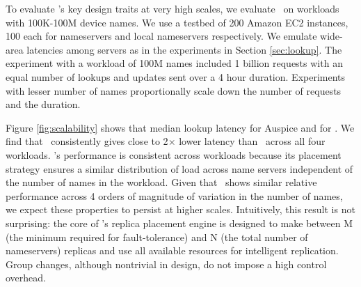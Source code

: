 To evaluate \auspice's key design traits at very high scales, we evaluate \auspice\ on workloads with 100K-100M device names.  We use a testbed of 200 Amazon EC2 instances, 100 each for nameservers and local nameservers respectively. We emulate wide-area latencies among servers as in the experiments in Section \ref{sec:lookup}. The experiment with a workload of 100M names included 1 billion requests with an equal number of lookups and updates sent over a 4 hour duration. Experiments with lesser number of names proportionally scale down the number of requests and the  duration.  

Figure \ref{fig:scalability} shows that median lookup latency for Auspice and for \staticthree. We find that \auspice\ consistently gives close to 2$\times$ lower latency than \staticthree\ across all four workloads. 
\auspice's performance is consistent across workloads because its placement strategy ensures a similar distribution of load across name servers independent of the number of names in the workload.
Given that \auspice\ shows similar relative performance across 4 orders of magnitude of variation in the number of names, we expect these properties to persist at higher scales. Intuitively, this result is not surprising: the core of \auspice's replica placement engine is designed to make between M (the minimum required for fault-tolerance) and N (the total number of nameservers) replicas and use all available resources for intelligent replication. Group changes, although nontrivial in design, do not impose a high control overhead.




